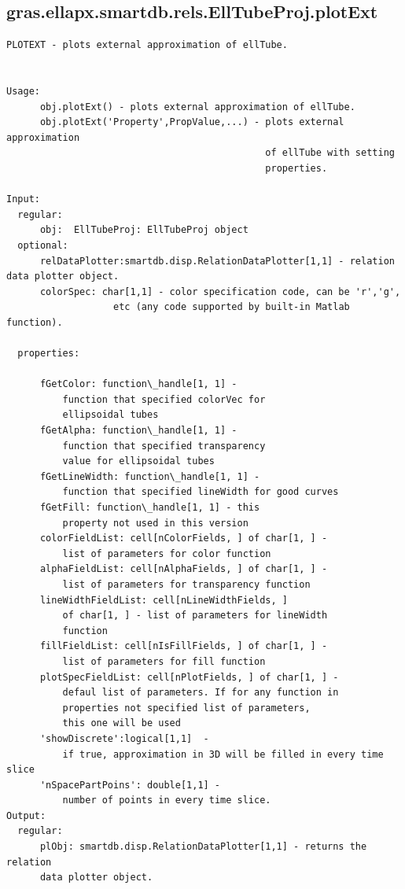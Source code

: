 \documentclass[letterpaper,10pt,english]{sphinxmanual}
\begin{document}
\subsection{gras.ellapx.smartdb.rels.EllTubeProj.plotExt}
\label{chap_functions:gras-ellapx-smartdb-rels-elltubeproj-plotext}
\begin{Verbatim}[commandchars=\\\{\}]
PLOTEXT - plots external approximation of ellTube.


Usage:
      obj.plotExt() - plots external approximation of ellTube.
      obj.plotExt('Property',PropValue,...) - plots external approximation
                                              of ellTube with setting
                                              properties.

Input:
  regular:
      obj:  EllTubeProj: EllTubeProj object
  optional:
      relDataPlotter:smartdb.disp.RelationDataPlotter[1,1] - relation data plotter object.
      colorSpec: char[1,1] - color specification code, can be 'r','g',
                   etc (any code supported by built-in Matlab function).

  properties:

      fGetColor: function\_handle[1, 1] -
          function that specified colorVec for
          ellipsoidal tubes
      fGetAlpha: function\_handle[1, 1] -
          function that specified transparency
          value for ellipsoidal tubes
      fGetLineWidth: function\_handle[1, 1] -
          function that specified lineWidth for good curves
      fGetFill: function\_handle[1, 1] - this
          property not used in this version
      colorFieldList: cell[nColorFields, ] of char[1, ] -
          list of parameters for color function
      alphaFieldList: cell[nAlphaFields, ] of char[1, ] -
          list of parameters for transparency function
      lineWidthFieldList: cell[nLineWidthFields, ]
          of char[1, ] - list of parameters for lineWidth
          function
      fillFieldList: cell[nIsFillFields, ] of char[1, ] -
          list of parameters for fill function
      plotSpecFieldList: cell[nPlotFields, ] of char[1, ] -
          defaul list of parameters. If for any function in
          properties not specified list of parameters,
          this one will be used
      'showDiscrete':logical[1,1]  -
          if true, approximation in 3D will be filled in every time slice
      'nSpacePartPoins': double[1,1] -
          number of points in every time slice.
Output:
  regular:
      plObj: smartdb.disp.RelationDataPlotter[1,1] - returns the relation
      data plotter object.
\end{Verbatim}
\end{document}
